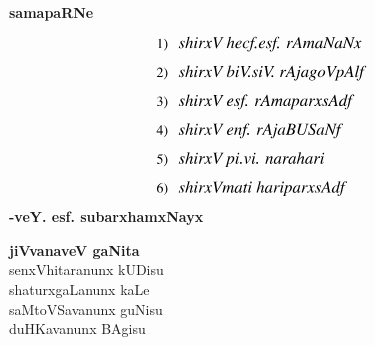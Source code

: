 

~
\medskip

\vfill

\thispagestyle{empty}

\begin{center}
{\Large\bfseries samapaRNe}
\end{center}
\bigskip

\begin{align*}
1) &~~~ \text{\large {\em shirxV hecf.esf. rAmaNaNx}}\\[0.2cm]
2) &~~~ \text{\large {\em shirxV biV.siV. rAjagoVpAlf}}\\[0.2cm]
3) &~~~ \text{\large {\em shirxV esf. rAmaparxsAdf}}\\[0.2cm]
4) &~~~ \text{\large {\em shirxV enf. rAjaBUSaNf}}\\[0.2cm]
5) &~~~\text{\large {\em shirxV pi.vi. narahari }}\\[0.2cm]
6) &~~~\text{\large {\em shirxVmati hariparxsAdf}}
\end{align*}
\hfill{\bf -veY. esf. subarxhamxNayx}                                                 

\vfill
\begin{center}
{\bf jiVvanaveV gaNita}\\
  senxVhitaranunx kUDisu\\
  shaturxgaLanunx kaLe\\
  saMtoVSavanunx guNisu\\
  duHKavanunx BAgisu
\end{center}
\vfill
\eject


